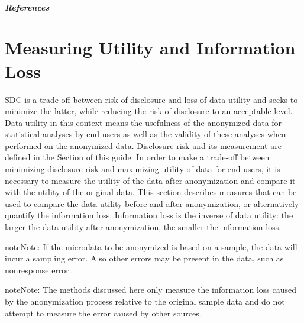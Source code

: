 \documentclass[letterpaper,10pt,english]{sphinxmanual}
\begin{document}
\paragraph{References}


\chapter{Measuring Utility and Information Loss}
\label{\detokenize{utility:measuring-utility-and-information-loss}}\label{\detokenize{utility::doc}}
SDC is a trade-off between risk of disclosure and loss of data utility
and seeks to minimize the latter, while reducing the risk of disclosure
to an acceptable level. Data utility in this context means the
usefulness of the anonymized data for statistical analyses by end users
as well as the validity of these analyses when performed on the
anonymized data. Disclosure risk and its measurement are defined in
the Section  of this guide.
In order to make a trade-off between minimizing
disclosure risk and maximizing utility of data for end users, it is
necessary to measure the utility of the data after anonymization and
compare it with the utility of the original data. This section describes
measures that can be used to compare the data utility before and after
anonymization, or alternatively quantify the information loss.
Information loss is the inverse of data utility: the larger the data
utility after anonymization, the smaller the information loss.

\begin{sphinxadmonition}{note}{Note:}
If the microdata to be anonymized is based on a sample, the data will incur
a sampling error. Also other errors may be present in the data, such as
nonresponse error.
\end{sphinxadmonition}

\begin{sphinxadmonition}{note}{Note:}
The methods discussed here only measure the
information loss caused by the anonymization process relative to the
original sample data and do not attempt to measure the error caused by
other sources.
\end{sphinxadmonition}
\end{document}
